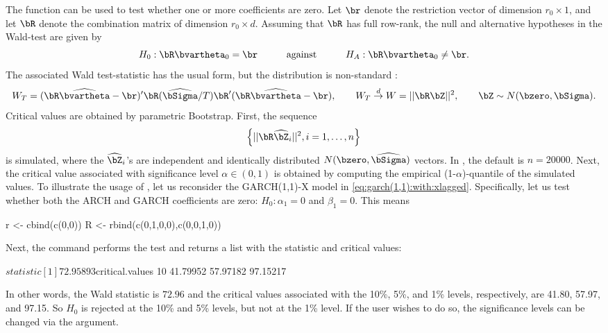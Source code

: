 The function  can be used to test whether one or more coefficients are zero. Let $\br$ denote the restriction vector of dimension $r_0 \times 1$, and let $\bR$ denote the combination matrix of dimension $r_0 \times d$. Assuming that $\bR$ has full row-rank, the null and alternative hypotheses in the Wald-test are given by
%
\begin{equation*}
	H_0: \bR\bvartheta_0 = \br \quad\quad\quad\text{against}\quad\quad\quad H_A: \bR\bvartheta_0 \neq \br.
\end{equation*}
%
The associated Wald test-statistic has the usual form, but the distribution is non-standard \citep{FrancqThieu2018}:
%
\begin{equation*}
	W_T = (\bR\widehat{\bvartheta} - \br)' \bR (\widehat{\bSigma}/T) \bR' (\bR\widehat{\bvartheta} - \br), \qquad W_T \overset{d}{\rightarrow} W = || \bR\bZ ||^2, \qquad \bZ \sim N(\bzero, \bSigma).
\end{equation*}
%
Critical values are obtained by parametric Bootstrap. First, the sequence
%
\begin{equation*}
	\left\{ || \bR\widehat{\bZ}_i ||^2, i=1, \ldots, n \right\}
\end{equation*}
%
is simulated, where the $\widehat{\bZ}_i$'s are independent and identically distributed $N(\bzero, \widehat{\bSigma})$ vectors. In , the default is $n=20000$. Next, the critical value associated with significance level $\alpha \in (0,1)$ is obtained by computing the empirical (1-$\alpha$)-quantile of the simulated values. To illustrate the usage of , let us reconsider the GARCH(1,1)-X model in \eqref{eq:garch(1,1):with:xlagged}. Specifically, let us test whether both the ARCH and GARCH coefficients are zero: $H_0: \alpha_1=0$ and $\beta_1=0$. This means
%
\begin{example}
	r <- cbind(c(0,0))
	R <- rbind(c(0,1,0,0),c(0,0,1,0))
\end{example}
%
Next, the command  performs the test and returns a list with the statistic and critical values:
%
\begin{example}
	$statistic
	[1] 72.95893
	
	$critical.values
	10%
	41.79952 57.97182 97.15217	
\end{example}
%
In other words, the Wald statistic is $72.96$ and the critical values associated with the 10\%, 5\%, and 1\% levels, respectively, are 41.80, 57.97, and 97.15. So $H_0$ is rejected at the 10\% and 5\% levels, but not at the 1\% level. If the user wishes to do so, the significance levels can be changed via the  argument.


